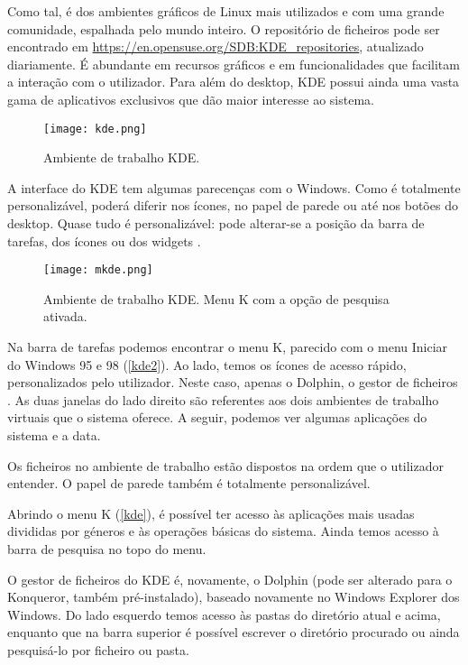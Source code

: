 \documentclass[11pt,openright,twoside]{report}
\begin{document}
Como tal, é dos ambientes gráficos de Linux mais utilizados e com uma grande comunidade, espalhada pelo mundo inteiro. O repositório de ficheiros pode ser encontrado em \url{https://en.opensuse.org/SDB:KDE_repositories}, atualizado diariamente. É abundante em recursos gráficos e em funcionalidades que facilitam a interação com o utilizador. Para além do desktop, KDE possui ainda uma vasta gama de aplicativos exclusivos que dão maior interesse ao sistema.

\begin{figure}
 \center
 \texttt{[image: kde.png]}
 \caption{Ambiente de trabalho KDE.}
 \label{kde2}
\end{figure}

A interface do KDE tem algumas parecenças com o Windows. Como é totalmente personalizável, poderá diferir nos ícones, no papel de parede ou até nos botões do desktop. Quase tudo é personalizável: pode alterar-se a posição da barra de tarefas, dos ícones ou dos widgets \cite{InterfaceKDE}.

\begin{figure}
 \center
 \texttt{[image: mkde.png]}
 \caption{Ambiente de trabalho KDE. Menu K com a opção de pesquisa ativada.}
 \label{kde}
\end{figure}

Na barra de tarefas podemos encontrar o menu K, parecido com o menu Iniciar do Windows 95 e 98 (\autoref{kde2}). Ao lado, temos os ícones de acesso rápido, personalizados pelo utilizador. Neste caso, apenas o Dolphin, o gestor de ficheiros \cite{dolphin}. As duas janelas do lado direito são referentes aos dois ambientes de trabalho virtuais que o sistema oferece. A seguir, podemos ver algumas aplicações do sistema e a data.

Os ficheiros no ambiente de trabalho estão dispostos na ordem que o utilizador entender. O papel de parede também é totalmente personalizável.

Abrindo o menu K (\autoref{kde}), é possível ter acesso às aplicações mais usadas divididas por géneros e às operações básicas do sistema. Ainda temos acesso à barra de pesquisa no topo do menu.

O gestor de ficheiros do KDE é, novamente, o Dolphin (pode ser alterado para o Konqueror, também pré-instalado), baseado novamente no Windows Explorer dos Windows. Do lado esquerdo temos acesso às pastas do diretório atual e acima, enquanto que na barra superior é possível escrever o diretório procurado ou ainda pesquisá-lo por ficheiro ou pasta.
\end{document}
